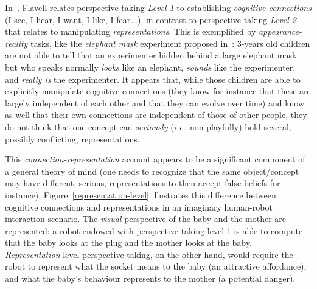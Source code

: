 \documentclass{sig-alternate}
\newcommand{\ie}{{\textit{i.e.~}}}
\begin{document}
In~\cite{flavell1990developmental}, Flavell relates perspective taking
\emph{Level 1} to establishing \emph{cognitive connections} (I see, I hear, I
want, I like, I fear...), in contrast to perspective taking \emph{Level 2} that
relates to manipulating \emph{representations}.  This is exemplified by
\emph{appearance-reality} tasks, like the \emph{elephant mask} experiment
proposed in~\cite{flavell1990developmental}: 3-years old children are not able
to tell that an experimenter hidden behind a large elephant mask but who speaks
normally \emph{looks} like an elephant, \emph{sounds} like the experimenter, and
\emph{really is} the experimenter.  It appears that, while those children are
able to explicitly manipulate cognitive connections (they know for instance that
these are largely independent of each other and that they can evolve over time)
and know as well that their own connections are independent of those of other
people, they do not think that one concept can \emph{seriously} (\ie non
playfully) hold several, possibly conflicting, representations.

This \emph{connection-representation} account appears to be a significant
component of a general theory of mind (one needs to recognize that the same
object/concept may have different, serious, representations to then accept false
beliefs for instance). Figure~\ref{representation-level} illustrates this
difference between cognitive connections and representations in an imaginary
human-robot interaction scenario. The \emph{visual} perspective of the baby and
the mother are represented: a robot endowed with perspective-taking level 1 is
able to compute that the baby looks at the plug and the mother looks at the
baby.  \emph{Representation}-level perspective taking, on the other hand, would
require the robot to represent what the socket means to the baby (an attractive
affordance), and what the baby's behaviour represents to the mother (a potential
danger).


\end{document}
